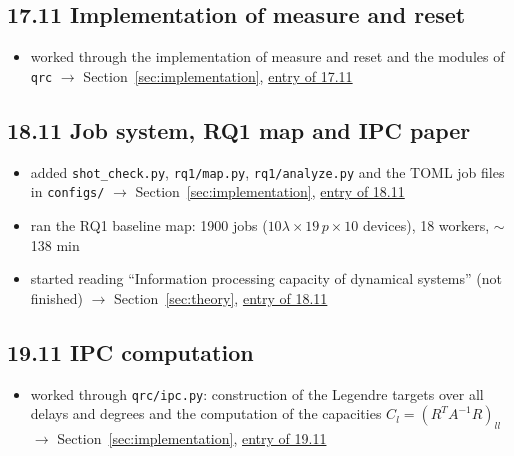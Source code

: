 \subsection*{17.11 \quad Implementation of measure and reset}
\begin{itemize}
    \item worked through the implementation of measure and reset and the modules of \texttt{qrc} $\to$ Section~\ref{sec:implementation}, \hyperref[sec:qrc-overview]{entry of 17.11}
\end{itemize}

\subsection*{18.11 \quad Job system, RQ1 map and IPC paper}
\begin{itemize}
    \item added \texttt{shot\_check.py}, \texttt{rq1/map.py}, \texttt{rq1/analyze.py} and the TOML job files in
    \texttt{configs/} $\to$ Section~\ref{sec:implementation}, \hyperref[sec:job-system]{entry of 18.11}
    \item ran the RQ1 baseline map: 1900 jobs ($10 \lambda \times 19\, p \times 10$ devices), 18 workers, $\sim$138 min
    \item started reading ``Information processing capacity of dynamical systems'' (not finished)
    $\to$ Section~\ref{sec:theory}, \hyperref[sec:ipc-paper]{entry of 18.11}
\end{itemize}

\subsection*{19.11 \quad IPC computation}
\begin{itemize}
    \item worked through \texttt{qrc/ipc.py}: construction of the Legendre targets over all delays and degrees
    and the computation of the capacities $C_l = (R^T A^{-1} R)_{ll}$ $\to$ Section~\ref{sec:implementation},
    \hyperref[sec:ipc-implementation]{entry of 19.11}
\end{itemize}

